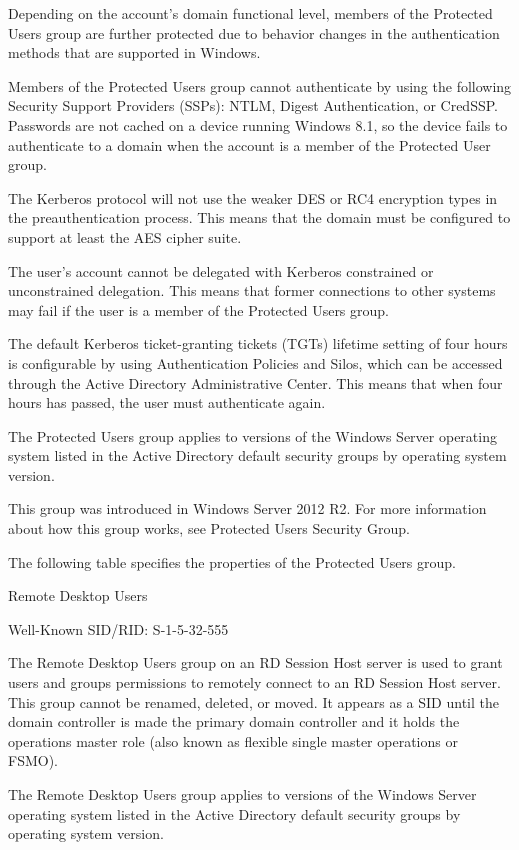Depending on the account’s domain functional level, members of the Protected Users group are further protected due to behavior changes in the authentication methods that are supported in Windows.

Members of the Protected Users group cannot authenticate by using the following Security Support Providers (SSPs): NTLM, Digest Authentication, or CredSSP. Passwords are not cached on a device running Windows 8.1, so the device fails to authenticate to a domain when the account is a member of the Protected User group.

The Kerberos protocol will not use the weaker DES or RC4 encryption types in the preauthentication process. This means that the domain must be configured to support at least the AES cipher suite.

The user’s account cannot be delegated with Kerberos constrained or unconstrained delegation. This means that former connections to other systems may fail if the user is a member of the Protected Users group.

The default Kerberos ticket-granting tickets (TGTs) lifetime setting of four hours is configurable by using Authentication Policies and Silos, which can be accessed through the Active Directory Administrative Center. This means that when four hours has passed, the user must authenticate again.

The Protected Users group applies to versions of the Windows Server operating system listed in the Active Directory default security groups by operating system version.

This group was introduced in Windows Server 2012 R2. For more information about how this group works, see Protected Users Security Group.

The following table specifies the properties of the Protected Users group.

Remote Desktop Users

Well-Known SID/RID: S-1-5-32-555

The Remote Desktop Users group on an RD Session Host server is used to grant users and groups permissions to remotely connect to an RD Session Host server. This group cannot be renamed, deleted, or moved. It appears as a SID until the domain controller is made the primary domain controller and it holds the operations master role (also known as flexible single master operations or FSMO).

The Remote Desktop Users group applies to versions of the Windows Server operating system listed in the Active Directory default security groups by operating system version.

